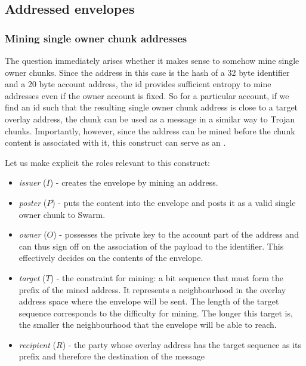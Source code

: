 \subsection{Addressed envelopes\statusgreen}\label{sec:addressed-envelopes}

\subsubsection{Mining single owner chunk addresses}

The question immediately arises whether it makes sense to somehow mine single owner chunks. Since the address in this case is the hash of a 32 byte identifier and a 20 byte account address, the id provides sufficient entropy to mine addresses even if the owner account is fixed. So for a particular account, if we find an id such that the resulting single owner chunk address is close to a target overlay address, the chunk can be used as a message in a similar way to Trojan chunks. Importantly, however, since the address can be mined before the chunk content is associated with it, this construct can serve as an .

Let us make explicit the roles relevant to this construct:

\begin{itemize}[noitemsep]
\item \emph{issuer} ($I$) - creates the envelope by mining an address. 
\item \emph{poster} ($P$) - puts the content into the envelope and posts it as a valid single owner chunk to Swarm.
\item \emph{owner} ($O$) - possesses the private key to the account part of the address and can thus sign off on the association of the payload to the identifier. This effectively decides on the contents of the envelope.
\item \emph{target} ($T$) - the constraint for mining: a bit sequence that must form the prefix of the mined address. It represents a neighbourhood in the overlay address space where the envelope will be sent. The length of the target sequence corresponds to the difficulty for mining. The longer this target is, the smaller the neighbourhood that the envelope will be able to reach.
\item \emph{recipient} ($R$) - the party whose overlay address has the target sequence as its prefix and therefore the destination of the message
\end{itemize}

